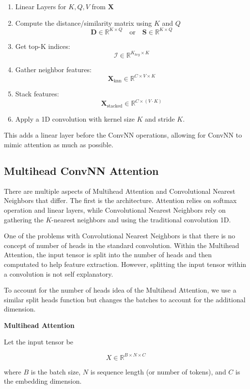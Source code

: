 \documentclass{article}
\begin{document}
\begin{enumerate}
    \item Linear Layers for \(K, Q, V\) from \(\mathbf{X}\)
    \item Compute the distance/similarity matrix using \(K\) and \(Q\)
    \[
        \mathbf{D} \in \mathbb{R}^{K \times Q} \quad \text{or} \quad \mathbf{S} \in \mathbb{R}^{K \times Q}
    \]
    \item Get top-K indices: 
    \[
        \mathcal{I} \in \mathbb{R}^{K_{key} \times K}
    \]
    \item Gather neighbor features: 
    \[
        \mathbf{X}_{\text{knn}} \in \mathbb{R}^{C \times V \times K}
    \]
    \item Stack features: 
    \[
        \mathbf{X}_{\text{stacked}} \in \mathbb{R}^{C \times (V \cdot K)}
    \]
    \item Apply a 1D convolution with kernel size \(K\) and stride \(K\).
\end{enumerate}

This adds a linear layer before the ConvNN operations, allowing for ConvNN to mimic attention as much as possible. 

\subsection{Multihead ConvNN Attention}
There are multiple aspects of Multihead Attention and Convolutional Nearest Neighbors that differ. The first is the architecture. Attention relies on softmax operation and linear layers, while Convolutional Nearest Neighbors rely on gathering the \(K\)-nearest neighbors and using the traditional convolution 1D. 

One of the problems with Convolutional Nearest Neighbors is that there is no concept of number of heads in the standard convolution. Within the Multihead Attention, the input tensor is split into the number of heads and then computated to help feature extraction. However, splitting the input tensor within a convolution is not self explanatory. 

To account for the number of heads idea of the Multihead Attention, we use a similar split heads function but changes the batches to account for the additional dimension. 

\textbf{Multihead Attention} 

Let the input tensor be 

\[
    X \in \mathbb{R}^{B \times N \times C}
\]

where $B$ is the batch size, $N$ is sequence length (or number of tokens), and $C$ is the embedding dimension. 
\end{document}
